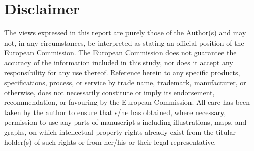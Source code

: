 \section*{Disclaimer}
The views expressed in this report are purely those of the Author(s) and may not, in any circumstances, be
interpreted as stating an official position of the European Commission. The European Commission does not
guarantee the accuracy of the information included in this study, nor does it accept any responsibility for
any use thereof. Reference herein to any specific products, specifications, process, or service by trade name,
trademark, manufacturer, or otherwise, does not necessarily constitute or imply its endorsement, recommendation, or favouring by the European Commission. All care has been taken by the author to ensure that s/he
has obtained, where necessary, permission to use any parts of manuscript s including illustrations, maps, and
graphs, on which intellectual property rights already exist from the titular holder(s) of such rights or from
her/his or their legal representative.
